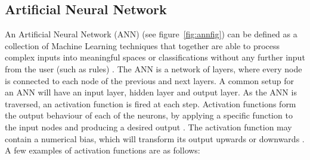 \subsection{Artificial Neural Network}\label{sec:headings}
An Artificial Neural Network (ANN) (see figure~\ref{fig:annfig}) can be defined as a collection of Machine Learning techniques that together are able to process complex inputs into meaningful spaces or classifications without any further input from the user (such as rules) \cite{GURESEN2011426}. The ANN is a network of layers, where every node is connected to each node of the previous and next layers. A common setup for an ANN will have an input layer, hidden layer and output layer. As the ANN is traversed, an activation function is fired at each step. Activation functions form the output behaviour of each of the neurons, by applying a specific function to the input nodes and producing a desired output \cite{Haykin:1994:NNC:541500}. The activation function may contain a numerical bias, which will transform its output upwards or downwards \cite{Haykin:1994:NNC:541500}. A few examples of activation functions are as follows:\\
